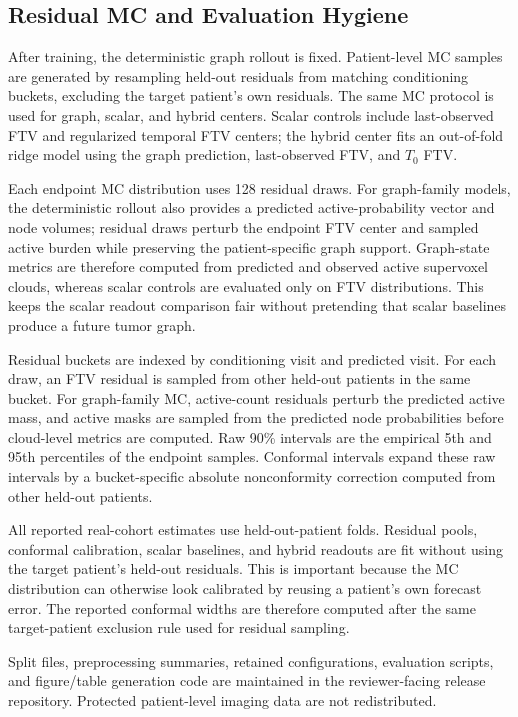 \documentclass[journal,twoside,print]{ieeecolor}
\newcommand{\Tzero}{\ensuremath{T_0}}
\begin{document}
\subsection{Residual MC and Evaluation Hygiene}

After training, the deterministic graph rollout is fixed. Patient-level MC
samples are generated by resampling held-out residuals from matching
conditioning buckets, excluding the target patient's own residuals. The same MC
protocol is used for graph, scalar, and hybrid centers. Scalar controls include
last-observed FTV and regularized temporal FTV centers; the hybrid center fits
an out-of-fold ridge model using the graph prediction, last-observed FTV, and
\Tzero{} FTV.

Each endpoint MC distribution uses 128 residual draws. For graph-family models,
the deterministic rollout also provides a predicted active-probability vector
and node volumes; residual draws perturb the endpoint FTV center and sampled
active burden while preserving the patient-specific graph support. Graph-state
metrics are therefore computed from predicted and observed active supervoxel
clouds, whereas scalar controls are evaluated only on FTV distributions. This
keeps the scalar readout comparison fair without pretending that scalar
baselines produce a future tumor graph.

Residual buckets are indexed by conditioning visit and predicted visit. For each
draw, an FTV residual is sampled from other held-out patients in the same bucket.
For graph-family MC, active-count residuals perturb the predicted active mass,
and active masks are sampled from the predicted node probabilities before
cloud-level metrics are computed. Raw 90\% intervals are the empirical 5th and
95th percentiles of the endpoint samples. Conformal intervals expand these raw
intervals by a bucket-specific absolute nonconformity correction computed from
other held-out patients.

All reported real-cohort estimates use held-out-patient folds. Residual pools,
conformal calibration, scalar baselines, and hybrid readouts are fit without
using the target patient's held-out residuals. This is important because the
MC distribution can otherwise look calibrated by reusing a patient's own
forecast error. The reported conformal widths are therefore computed after the
same target-patient exclusion rule used for residual sampling.

Split files, preprocessing summaries, retained configurations, evaluation
scripts, and figure/table generation code are maintained in the reviewer-facing
release repository. Protected patient-level imaging data are not redistributed.
\end{document}
